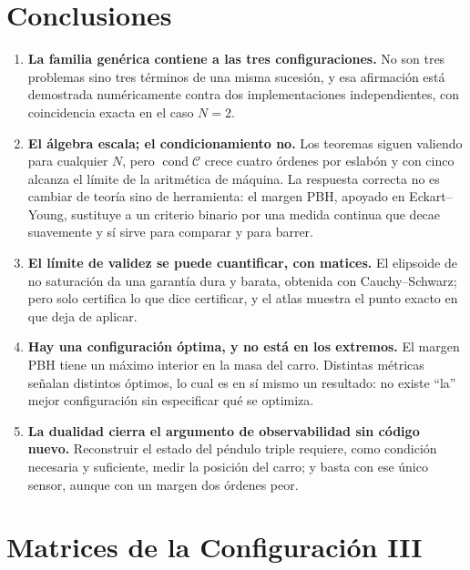 \documentclass[11pt,letterpaper]{article}
\theoremstyle{definition}
\theoremstyle{plain}
\theoremstyle{remark}
\newcommand{\calC}{\mathcal{C}}
\begin{document}
\section{Conclusiones}

\begin{enumerate}
  \item \textbf{La familia genérica contiene a las tres configuraciones.} No son
  tres problemas sino tres términos de una misma sucesión, y esa afirmación está
  demostrada numéricamente contra dos implementaciones independientes, con
  coincidencia exacta en el caso $N=2$.

  \item \textbf{El álgebra escala; el condicionamiento no.} Los teoremas siguen
  valiendo para cualquier $N$, pero $\operatorname{cond}\calC$ crece cuatro
  órdenes por eslabón y con cinco alcanza el límite de la aritmética de máquina.
  La respuesta correcta no es cambiar de teoría sino de herramienta: el margen
  PBH, apoyado en Eckart--Young, sustituye a un criterio binario por una medida
  continua que decae suavemente y sí sirve para comparar y para barrer.

  \item \textbf{El límite de validez se puede cuantificar, con matices.} El
  elipsoide de no saturación da una garantía dura y barata, obtenida con
  Cauchy--Schwarz; pero solo certifica lo que dice certificar, y el atlas muestra
  el punto exacto en que deja de aplicar.

  \item \textbf{Hay una configuración óptima, y no está en los extremos.} El
  margen PBH tiene un máximo interior en la masa del carro. Distintas métricas
  señalan distintos óptimos, lo cual es en sí mismo un resultado: no existe
  ``la'' mejor configuración sin especificar qué se optimiza.

  \item \textbf{La dualidad cierra el argumento de observabilidad sin código
  nuevo.} Reconstruir el estado del péndulo triple requiere, como condición
  necesaria y suficiente, medir la posición del carro; y basta con ese único
  sensor, aunque con un margen dos órdenes peor.
\end{enumerate}

\appendix
\section{Matrices de la Configuración III}
\label{ap:matrices}
\end{document}

